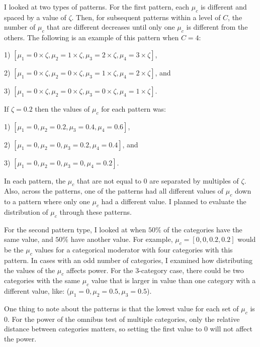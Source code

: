 I looked at two types of patterns. For the first pattern, each $\mu_c$ is different and spaced by a value of $\zeta$. Then, for subsequent patterns within a level of $C$, the number of $\mu_c$ that are different decreases until only one $\mu_c$ is different from the others. The following is an example of this pattern when $C=4$:

1) $[\mu_1 = 0 \times \zeta, \mu_2 = 1 \times \zeta, \mu_3 = 2 \times \zeta, \mu_4 = 3 \times \zeta ]$, 

2) $[\mu_1 = 0 \times \zeta, \mu_2 = 0 \times \zeta, \mu_3 = 1 \times \zeta, \mu_4 = 2 \times \zeta ]$, and 

3) $[\mu_1 = 0 \times \zeta, \mu_2 = 0 \times \zeta, \mu_3 = 0 \times \zeta, \mu_4 = 1 \times \zeta ]$. 

If $\zeta = 0.2$ then the values of $\mu_c$ for each pattern was: 

1) $[\mu_1 = 0, \mu_2 = 0.2, \mu_3 = 0.4, \mu_4 = 0.6 ]$, 

2) $[\mu_1 = 0, \mu_2 = 0, \mu_3 = 0.2, \mu_4 = 0.4 ]$, and 

3) $[\mu_1 = 0, \mu_2 = 0, \mu_3 = 0, \mu_4 = 0.2]$. 

In each pattern, the $\mu_c$ that are not equal to $0$ are separated by multiples of $\zeta$. Also, across the patterns, one of the patterns had all different values of $\mu_c$ down to a pattern where only one $\mu_c$ had a different value. I planned to evaluate the distribution of $\mu_c$ through these patterns.

For the second pattern type, I looked at when $50\%$ of the categories have the same value, and $50\%$ have another value. For example, $\mu_c = [0, 0, 0.2, 0.2]$ would be the $\mu_c$ values for a categorical moderator with four categories with this pattern. In cases with an odd number of categories, I examined how distributing the values of the $\mu_c$ affects power. For the 3-category case, there could be two categories with the same $\mu_c$ value that is larger in value than one category with a different value, like: ($\mu_1 = 0, \mu_2 = 0.5, \mu_3 = 0.5$). 


One thing to note about the patterns is that the lowest value for each set of $\mu_c$ is $0$. For the power of the omnibus test of multiple categories, only the relative distance between categories matters, so setting the first value to $0$ will not affect the power. %

